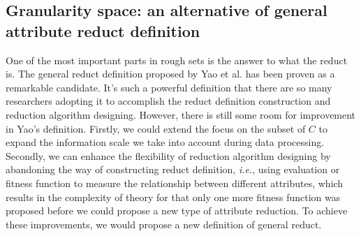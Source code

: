 \documentclass[review]{elsarticle}
\begin{document}
	\subsection{Granularity space: an alternative of general attribute reduct definition}\label{granularitySpace}
		\par One of the most important parts in rough sets is the answer to what the reduct is. The general reduct definition proposed by Yao et al. \cite{yao2008reduct} has been proven as a remarkable candidate. It's such a powerful definition that there are so many researchers adopting it to accomplish the reduct definition construction and reduction algorithm designing. However, there is still some room for improvement in Yao's definition. Firstly, we could extend the focus on the subset of $C$ to expand the information scale we take into account during data processing. Secondly, we can enhance the flexibility of reduction algorithm designing by abandoning the way of constructing reduct definition, \emph{i.e.}, using evaluation or fitness function to measure the relationship between different attributes, which results in the complexity of theory for that only one more fitness function was proposed before we could propose a new type of attribute reduction. To achieve these improvements, we would propose a new definition of general reduct. 
		
\end{document}

